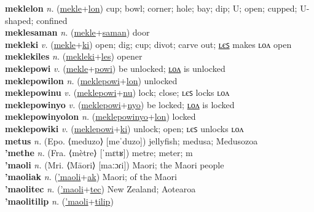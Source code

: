 \textbf{meklelon} \textit{n.} (\hyperref[mekle]{mekle}+\hyperref[lon]{lon})
cup; bowl; corner; hole; bay; dip; U; open; cupped; U-shaped; confined \label{meklelon} \\
\textbf{meklesaman} \textit{n.} (\hyperref[mekle]{mekle}+\hyperref[saman]{saman})
door \label{meklesaman} \\
\textbf{mekleki} \textit{v.} (\hyperref[mekle]{mekle}+\hyperref[ki]{ki})
open; dig; cup; divot; carve out; \hyperref[meklekiles]{ʟєꜱ} makes ʟᴏᴧ open \label{mekleki} \\
\textbf{meklekiles} \textit{n.} (\hyperref[mekleki]{mekleki}+\hyperref[les]{les})
opener \label{meklekiles} \\
\textbf{meklepowi} \textit{v.} (\hyperref[mekle]{mekle}+\hyperref[powi]{powi})
be unlocked; \hyperref[meklepowilon]{ʟᴏᴧ} is unlocked \label{meklepowi} \\
\textbf{meklepowilon} \textit{n.} (\hyperref[meklepowi]{meklepowi}+\hyperref[lon]{lon})
unlocked \label{meklepowilon} \\
\textbf{meklepowinu} \textit{v.} (\hyperref[meklepowi]{meklepowi}+\hyperref[nu]{nu})
lock; close; ʟєꜱ locks ʟᴏᴧ \label{meklepowinu} \\
\textbf{meklepowinyo} \textit{v.} (\hyperref[meklepowi]{meklepowi}+\hyperref[nyo]{nyo})
be locked; \hyperref[meklepowinyolon]{ʟᴏᴧ} is locked \label{meklepowinyo} \\
\textbf{meklepowinyolon} \textit{n.} (\hyperref[meklepowinyo]{meklepowinyo}+\hyperref[lon]{lon})
locked \label{meklepowinyolon} \\
\textbf{meklepowiki} \textit{v.} (\hyperref[meklepowi]{meklepowi}+\hyperref[ki]{ki})
unlock; open; ʟєꜱ unlocks ʟᴏᴧ \label{meklepowiki} \\
\textbf{metus} \textit{n.} (Epo. ⟨meduzo⟩ [meˈduzo])
jellyfish; medusa; Medusozoa \label{metus} \\
\textbf{'methe} \textit{n.} (Fra. ⟨mètre⟩ [ˈmɛtʁ])
metre; meter; m \label{'methe} \\
\textbf{'maoli} \textit{n.} (Mri. ⟨Māori⟩ [maːɔɾi])
Maori; the Maori people \label{'maoli} \\
\textbf{'maoliak} \textit{n.} (\hyperref['maoli]{'maoli}+\hyperref[ak]{ak})
Maori; of the Maori \label{'maoliak} \\
\textbf{'maolitec} \textit{n.} (\hyperref['maoli]{'maoli}+\hyperref[tec]{tec})
New Zealand; Aotearoa \label{'maolitec} \\
\textbf{'maolitilip} \textit{n.} (\hyperref['maoli]{'maoli}+\hyperref[tilip]{tilip})
